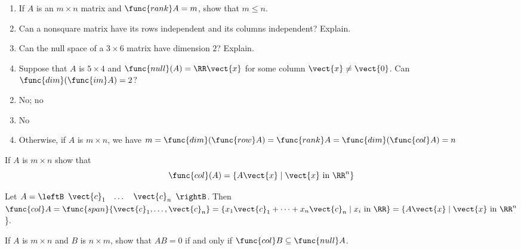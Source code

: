 \begin{multicols}{2}
\begin{ex}
\begin{enumerate}[label={\alph*.}]
\item If $A$ is an $m \times n$ matrix and $\func{rank} A = m$, show that $m \leq n$.

\item Can a nonsquare matrix have its rows independent and its columns independent? Explain.

\item Can the null space of a $3 \times 6$ matrix have dimension $2$? Explain.

\item Suppose that $A$ is $5 \times 4$ and $\func{null}(A) = \RR\vect{x}$ for some column $\vect{x} \neq \vect{0}$. Can $\func{dim}(\func{im} A) = 2$?

\end{enumerate}
\begin{sol}
\begin{enumerate}[label={\alph*.}]
\setcounter{enumi}{1}
\item  No; no 

\setcounter{enumi}{3}
\item No

\setcounter{enumi}{5}
\item  Otherwise, if $A$ is $m \times n$, we have $m = \func{dim}(\func{row} A) = \func{rank} A = \func{dim}(\func{col} A) = n$

\end{enumerate}
\end{sol}
\end{ex}

\begin{ex}
If $A$ is $m \times n$ show that 
\begin{equation*}
\func{col}(A) = \{A\vect{x} \mid \vect{x} \mbox{ in }\RR^n\}
\end{equation*}

\begin{sol}
Let $A = 
\leftB \begin{array}{ccc}
\vect{c}_{1} & \dots & \vect{c}_{n}
\end{array} \rightB$. Then $\func{col} A = \func{span}\{\vect{c}_{1}, \dots, \vect{c}_{n}\} =
\{x_{1}\vect{c}_{1} + \dots + x_{n}\vect{c}_{n} \mid x_{i} \mbox{ in }\RR\}
= \{A\vect{x} \mid \vect{x} \mbox{ in }\RR^n$\}.
\end{sol}
\end{ex}

\begin{ex}
If $A$ is $m \times n$ and $B$ is $n \times m$, show that $AB = 0$ if and only if $\func{col} B \subseteq \func{null} A$.
\end{ex}


\end{multicols}
